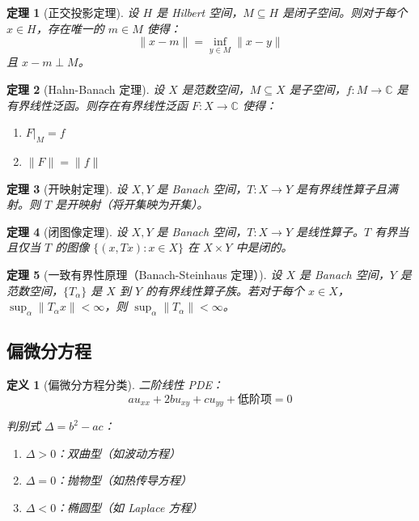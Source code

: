 \documentclass[12pt]{article}
\newtheorem{theorem}{定理}[section]
\newtheorem{definition}{定义}[section]
\begin{document}
\begin{theorem}[正交投影定理]
设 $H$ 是 Hilbert 空间，$M \subseteq H$ 是闭子空间。则对于每个 $x \in H$，存在唯一的 $m \in M$ 使得：
$$\|x - m\| = \inf_{y \in M} \|x - y\|$$
且 $x - m \perp M$。
\end{theorem}

\begin{theorem}[Hahn-Banach 定理]
设 $X$ 是范数空间，$M \subseteq X$ 是子空间，$f: M \to \mathbb{C}$ 是有界线性泛函。则存在有界线性泛函 $F: X \to \mathbb{C}$ 使得：
\begin{enumerate}
\item $F|_M = f$
\item $\|F\| = \|f\|$
\end{enumerate}
\end{theorem}

\begin{theorem}[开映射定理]
设 $X, Y$ 是 Banach 空间，$T: X \to Y$ 是有界线性算子且满射。则 $T$ 是开映射（将开集映为开集）。
\end{theorem}

\begin{theorem}[闭图像定理]
设 $X, Y$ 是 Banach 空间，$T: X \to Y$ 是线性算子。$T$ 有界当且仅当 $T$ 的图像 $\{(x, Tx) : x \in X\}$ 在 $X \times Y$ 中是闭的。
\end{theorem}

\begin{theorem}[一致有界性原理（Banach-Steinhaus 定理）]
设 $X$ 是 Banach 空间，$Y$ 是范数空间，$\{T_\alpha\}$ 是 $X$ 到 $Y$ 的有界线性算子族。若对于每个 $x \in X$，$\sup_\alpha \|T_\alpha x\| < \infty$，则 $\sup_\alpha \|T_\alpha\| < \infty$。
\end{theorem}

\subsection{偏微分方程}

\begin{definition}[偏微分方程分类]
二阶线性 PDE：
$$a u_{xx} + 2b u_{xy} + c u_{yy} + \text{低阶项} = 0$$

判别式 $\Delta = b^2 - ac$：
\begin{enumerate}
\item $\Delta > 0$：双曲型（如波动方程）
\item $\Delta = 0$：抛物型（如热传导方程）
\item $\Delta < 0$：椭圆型（如 Laplace 方程）
\end{enumerate}
\end{definition}
\end{document}
